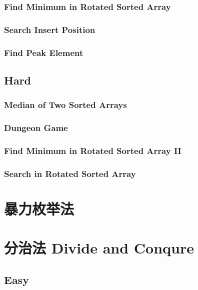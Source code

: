 \documentclass[11pt]{book}
\begin{document}
\subsection{Find Minimum in Rotated Sorted Array}
\label{sec-10-1-8}
\subsection{Search Insert Position}
\label{sec-10-1-9}
\subsection{Find Peak Element}
\label{sec-10-1-10}
\section{Hard}
\label{sec-10-2}
\subsection{Median of Two Sorted Arrays}
\label{sec-10-2-1}
\subsection{Dungeon Game}
\label{sec-10-2-2}
\subsection{Find Minimum in Rotated Sorted Array II}
\label{sec-10-2-3}
\subsection{Search in Rotated Sorted Array}
\label{sec-10-2-4}
\chapter{暴力枚举法}
\label{sec-11}
\section{}
\label{sec-11-1}
\subsection{}
\label{sec-11-1-1}
\chapter{分治法 Divide and Conqure}
\label{sec-12}
\section{Easy}
\label{sec-12-1}
\end{document}
